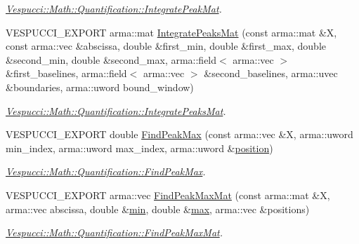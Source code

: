 \begin{DoxyCompactItemize}
\begin{DoxyCompactList}\small\item\em \hyperlink{namespace_vespucci_1_1_math_1_1_quantification_a9235b27f7823d4c3e9153aa20c9168a0}{Vespucci\+::\+Math\+::\+Quantification\+::\+Integrate\+Peak\+Mat}. \end{DoxyCompactList}\item 
V\+E\+S\+P\+U\+C\+C\+I\+\_\+\+E\+X\+P\+O\+RT arma\+::mat \hyperlink{namespace_vespucci_1_1_math_1_1_quantification_a5a5a95eee9686bd2741e2274ffd0e083}{Integrate\+Peaks\+Mat} (const arma\+::mat \&X, const arma\+::vec \&abscissa, double \&first\+\_\+min, double \&first\+\_\+max, double \&second\+\_\+min, double \&second\+\_\+max, arma\+::field$<$ arma\+::vec $>$ \&first\+\_\+baselines, arma\+::field$<$ arma\+::vec $>$ \&second\+\_\+baselines, arma\+::uvec \&boundaries, arma\+::uword bound\+\_\+window)
\begin{DoxyCompactList}\small\item\em \hyperlink{namespace_vespucci_1_1_math_1_1_quantification_ab4aac91c1126f5c95416167055e6f843}{Vespucci\+::\+Math\+::\+Quantification\+::\+Integrate\+Peaks\+Mat}. \end{DoxyCompactList}\item 
V\+E\+S\+P\+U\+C\+C\+I\+\_\+\+E\+X\+P\+O\+RT double \hyperlink{namespace_vespucci_1_1_math_1_1_quantification_a67d066d37ce165ac3e8c04d97436363c}{Find\+Peak\+Max} (const arma\+::vec \&X, arma\+::uword min\+\_\+index, arma\+::uword max\+\_\+index, arma\+::uword \&\hyperlink{namespace_vespucci_1_1_math_a62f5e835cad1e15513494a5a48e028ae}{position})
\begin{DoxyCompactList}\small\item\em \hyperlink{namespace_vespucci_1_1_math_1_1_quantification_a67d066d37ce165ac3e8c04d97436363c}{Vespucci\+::\+Math\+::\+Quantification\+::\+Find\+Peak\+Max}. \end{DoxyCompactList}\item 
V\+E\+S\+P\+U\+C\+C\+I\+\_\+\+E\+X\+P\+O\+RT arma\+::vec \hyperlink{namespace_vespucci_1_1_math_1_1_quantification_ac8a29afbde382eddd90a15749a8c3151}{Find\+Peak\+Max\+Mat} (const arma\+::mat \&X, arma\+::vec abscissa, double \&\hyperlink{namespace_vespucci_1_1_math_a884dc00603c6aed8e2ee23988c429c64}{min}, double \&\hyperlink{namespace_vespucci_1_1_math_a3d8f536b4465a4bacce89a51e3854daf}{max}, arma\+::vec \&positions)
\begin{DoxyCompactList}\small\item\em \hyperlink{namespace_vespucci_1_1_math_1_1_quantification_ac8a29afbde382eddd90a15749a8c3151}{Vespucci\+::\+Math\+::\+Quantification\+::\+Find\+Peak\+Max\+Mat}. \end{DoxyCompactList}\item 

\end{DoxyCompactItemize}
